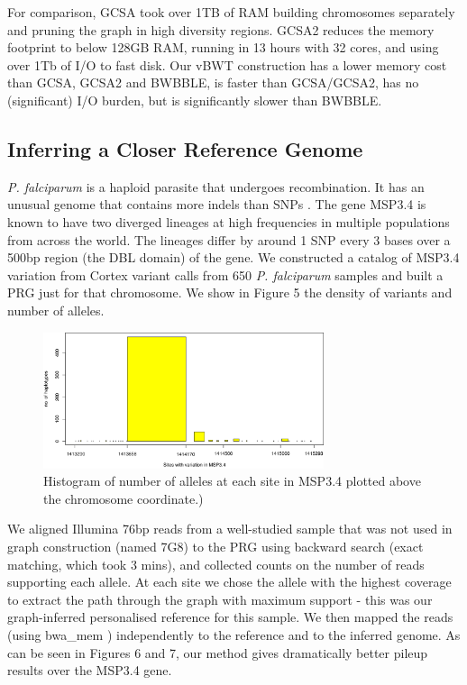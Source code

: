 \documentclass[runningheads,a4paper]{llncs}
\begin{document}
For comparison, GCSA took over 1TB of RAM building chromosomes separately and pruning the graph in high diversity regions. GCSA2 reduces the memory footprint to below 128GB RAM, running in 13 hours with 32 cores, and using  over 1Tb of I/O to fast disk. Our vBWT construction has a lower memory cost than GCSA, GCSA2 and BWBBLE, is faster than GCSA/GCSA2, has no (significant) I/O burden, but is significantly slower than BWBBLE. 



\subsection{Inferring a Closer Reference Genome}

\textit{P. falciparum} is a haploid parasite that undergoes recombination. It has an unusual genome that contains more indels than SNPs \cite{miles}. The gene MSP3.4 is known to have two  diverged lineages at high frequencies in multiple populations from across the world.  The lineages differ by around 1 SNP every 3 bases over a 500bp region (the DBL domain) of the gene. We constructed a catalog of MSP3.4 variation from Cortex \cite{iqbal} variant calls from 650 \textit{P. falciparum} samples and built a PRG just for that chromosome. We show in Figure 5 the density of variants and number of alleles. 

\begin{figure} 
\centering
\includegraphics[height=4cm]{PRG.png}
\caption{Histogram of number of alleles at each site in MSP3.4 plotted above the chromosome coordinate.)}
\label{fig:example}
\end{figure}

We aligned Illumina 76bp reads from a well-studied sample that was not used in graph construction (named 7G8) to the PRG using backward search (exact matching, which took 3 mins), and collected counts on the number of reads supporting each allele. At each site we chose the allele with the highest coverage to extract the path through the graph with maximum support - this was our graph-inferred personalised reference for this sample. We then mapped the reads (using bwa\_mem \cite{hengli}) independently to the reference and to the inferred genome. As can be seen in Figures 6 and 7, our method gives dramatically better pileup results over the MSP3.4 gene.
\end{document}
